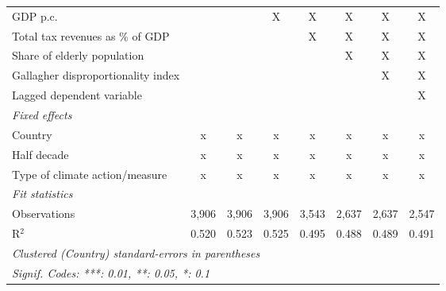 \begin{table}[htbp]
\begin{tabular}{lccccccc}
      GDP p.c.                                                                           &                &                & X              & X              & X             & X             & X\\  
      Total tax revenues as \% of GDP                                                    &                &                &                & X              & X             & X             & X\\  
      Share of elderly population                                                        &                &                &                &                & X             & X             & X\\  
      Gallagher disproportionality index                                                 &                &                &                &                &               & X             & X\\  
      Lagged dependent variable                                                          &                &                &                &                &               &               & X\\  
      \emph{Fixed effects}\\
      Country                                                                            & x              & x              & x              & x              & x             & x             & x\\  
      Half decade                                                                        & x              & x              & x              & x              & x             & x             & x\\  
      Type of climate action/measure                                                     & x              & x              & x              & x              & x             & x             & x\\  
      \midrule \emph{Fit statistics}\\
      Observations                                                                       & 3,906          & 3,906          & 3,906          & 3,543          & 2,637         & 2,637         & 2,547\\  
      R$^2$                                                                              & 0.520          & 0.523          & 0.525          & 0.495          & 0.488         & 0.489         & 0.491\\  
      \midrule
      \multicolumn{8}{l}{\emph{Clustered (Country) standard-errors in parentheses}}\\
      \multicolumn{8}{l}{\emph{Signif. Codes: ***: 0.01, **: 0.05, *: 0.1}}\\
   \end{tabular}
\end{table}


